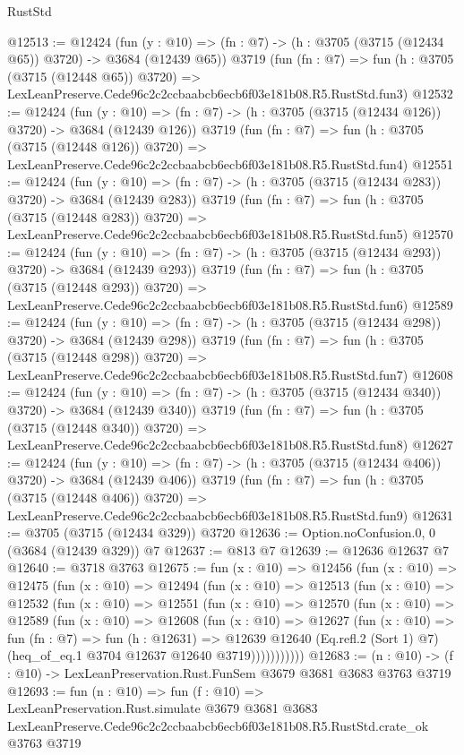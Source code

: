 \begin{lexlean}{RustStd}
\begin{coremodule}
@12513 := @12424
    (fun (y : @10) => (fn : @7) -> (h : @3705 (@3715 (@12434 @65)) @3720) -> @3684 (@12439 @65))
    @3719
    (fun (fn : @7) =>
    fun (h : @3705 (@3715 (@12448 @65)) @3720) =>
    LexLeanPreserve.Cede96c2c2ccbaabcb6ecb6f03e181b08.R5.RustStd.fun3)
@12532 := @12424
    (fun (y : @10) => (fn : @7) -> (h : @3705 (@3715 (@12434 @126)) @3720) -> @3684 (@12439 @126))
    @3719
    (fun (fn : @7) =>
    fun (h : @3705 (@3715 (@12448 @126)) @3720) =>
    LexLeanPreserve.Cede96c2c2ccbaabcb6ecb6f03e181b08.R5.RustStd.fun4)
@12551 := @12424
    (fun (y : @10) => (fn : @7) -> (h : @3705 (@3715 (@12434 @283)) @3720) -> @3684 (@12439 @283))
    @3719
    (fun (fn : @7) =>
    fun (h : @3705 (@3715 (@12448 @283)) @3720) =>
    LexLeanPreserve.Cede96c2c2ccbaabcb6ecb6f03e181b08.R5.RustStd.fun5)
@12570 := @12424
    (fun (y : @10) => (fn : @7) -> (h : @3705 (@3715 (@12434 @293)) @3720) -> @3684 (@12439 @293))
    @3719
    (fun (fn : @7) =>
    fun (h : @3705 (@3715 (@12448 @293)) @3720) =>
    LexLeanPreserve.Cede96c2c2ccbaabcb6ecb6f03e181b08.R5.RustStd.fun6)
@12589 := @12424
    (fun (y : @10) => (fn : @7) -> (h : @3705 (@3715 (@12434 @298)) @3720) -> @3684 (@12439 @298))
    @3719
    (fun (fn : @7) =>
    fun (h : @3705 (@3715 (@12448 @298)) @3720) =>
    LexLeanPreserve.Cede96c2c2ccbaabcb6ecb6f03e181b08.R5.RustStd.fun7)
@12608 := @12424
    (fun (y : @10) => (fn : @7) -> (h : @3705 (@3715 (@12434 @340)) @3720) -> @3684 (@12439 @340))
    @3719
    (fun (fn : @7) =>
    fun (h : @3705 (@3715 (@12448 @340)) @3720) =>
    LexLeanPreserve.Cede96c2c2ccbaabcb6ecb6f03e181b08.R5.RustStd.fun8)
@12627 := @12424
    (fun (y : @10) => (fn : @7) -> (h : @3705 (@3715 (@12434 @406)) @3720) -> @3684 (@12439 @406))
    @3719
    (fun (fn : @7) =>
    fun (h : @3705 (@3715 (@12448 @406)) @3720) =>
    LexLeanPreserve.Cede96c2c2ccbaabcb6ecb6f03e181b08.R5.RustStd.fun9)
@12631 := @3705 (@3715 (@12434 @329)) @3720
@12636 := Option.noConfusion.{0, 0} (@3684 (@12439 @329)) @7
@12637 := @813 @7
@12639 := @12636 @12637 @7
@12640 := @3718 @3763
@12675 := fun (x : @10) =>
  @12456
    (fun (x : @10) =>
    @12475
      (fun (x : @10) =>
      @12494
        (fun (x : @10) =>
        @12513
          (fun (x : @10) =>
          @12532
            (fun (x : @10) =>
            @12551
              (fun (x : @10) =>
              @12570
                (fun (x : @10) =>
                @12589
                  (fun (x : @10) =>
                  @12608
                    (fun (x : @10) =>
                    @12627
                      (fun (x : @10) =>
                      fun (fn : @7) =>
                      fun (h : @12631) =>
                      @12639
                        @12640
                        (Eq.refl.{2} (Sort 1) @7)
                        (heq_of_eq.{1} @3704 @12637 @12640 @3719)))))))))))
@12683 := (n : @10) -> (f : @10) -> LexLeanPreservation.Rust.FunSem @3679 @3681 @3683 @3763 @3719
@12693 := fun (n : @10) =>
  fun (f : @10) =>
  LexLeanPreservation.Rust.simulate
    @3679
    @3681
    @3683
    LexLeanPreserve.Cede96c2c2ccbaabcb6ecb6f03e181b08.R5.RustStd.crate_ok
    @3763
    @3719
\end{coremodule}
\end{lexlean}
